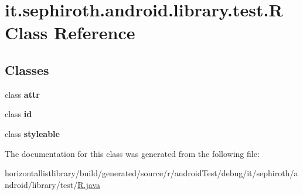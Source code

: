 \hypertarget{classit_1_1sephiroth_1_1android_1_1library_1_1test_1_1_r}{}\section{it.\+sephiroth.\+android.\+library.\+test.\+R Class Reference}
\label{classit_1_1sephiroth_1_1android_1_1library_1_1test_1_1_r}
\subsection*{Classes}
\begin{DoxyCompactItemize}
\item 
class {\bfseries attr}
\item 
class {\bfseries id}
\item 
class {\bfseries styleable}
\end{DoxyCompactItemize}


The documentation for this class was generated from the following file\+:\begin{DoxyCompactItemize}
\item 
horizontallistlibrary/build/generated/source/r/android\+Test/debug/it/sephiroth/android/library/test/\hyperlink{horizontallistlibrary_2build_2generated_2source_2r_2android_test_2debug_2it_2sephiroth_2android_2library_2test_2_r_8java}{R.\+java}\end{DoxyCompactItemize}
